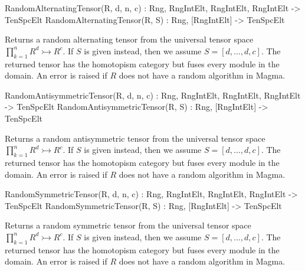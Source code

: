 \begin{intrinsics}
RandomAlternatingTensor(R, d, n, c) : Rng, RngIntElt, RngIntElt, RngIntElt -> TenSpcElt
RandomAlternatingTensor(R, S) : Rng, [RngIntElt] -> TenSpcElt
\end{intrinsics}

Returns a random alternating tensor from the universal tensor space $\prod_{k=1}^n R^d \rightarrowtail R^c$. 
If $S$ is given instead, then we assume $S=[d,\dots,d,c]$.
The returned tensor has the homotopism category but fuses every module in the domain.
An error is raised if $R$ does not have a random algorithm in Magma.

\begin{intrinsics}
RandomAntisymmetricTensor(R, d, n, c) : Rng, RngIntElt, RngIntElt, RngIntElt -> TenSpcElt
RandomAntisymmetricTensor(R, S) : Rng, [RngIntElt] -> TenSpcElt
\end{intrinsics}

Returns a random antisymmetric tensor from the universal tensor space $\prod_{k=1}^n R^d \rightarrowtail R^c$. 
If $S$ is given instead, then we assume $S=[d,\dots,d,c]$.
The returned tensor has the homotopism category but fuses every module in the domain.
An error is raised if $R$ does not have a random algorithm in Magma.

\begin{intrinsics}
RandomSymmetricTensor(R, d, n, c) : Rng, RngIntElt, RngIntElt, RngIntElt -> TenSpcElt
RandomSymmetricTensor(R, S) : Rng, [RngIntElt] -> TenSpcElt
\end{intrinsics}

Returns a random symmetric tensor from the universal tensor space $\prod_{k=1}^n R^d \rightarrowtail R^c$. 
If $S$ is given instead, then we assume $S=[d,\dots,d,c]$.
The returned tensor has the homotopism category but fuses every module in the domain.
An error is raised if $R$ does not have a random algorithm in Magma.


